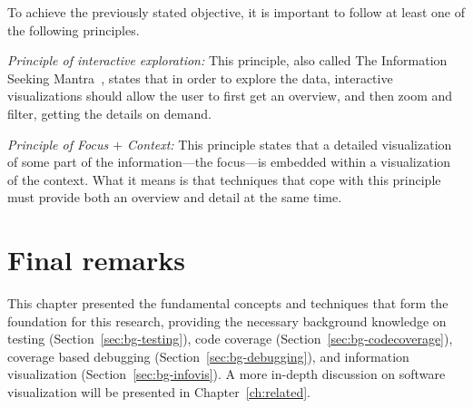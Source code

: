 To achieve the previously stated objective, it is important to follow at least
one of the following principles.

\textit{Principle of interactive exploration:} This principle, also called The
Information Seeking Mantra~\cite{shneiderman1996eyes}, states that in order to
explore the data, interactive visualizations should allow the user to first get
an overview, and then zoom and filter, getting the details on demand.

\textit{Principle of Focus $+$ Context:} This principle states that a detailed
visualization of some part of the information---the focus---is embedded within a
visualization of the context. What it means is that techniques that cope with
this principle must provide both an overview and detail at the same time.

\section{Final remarks}

This chapter presented the fundamental concepts and techniques that form the
foundation for this research, providing the necessary background knowledge on
testing (Section~\ref{sec:bg-testing}), code coverage
(Section~\ref{sec:bg-codecoverage}), coverage based debugging
(Section~\ref{sec:bg-debugging}), and information visualization
(Section~\ref{sec:bg-infovis}). A more in-depth discussion on software
visualization will be presented in Chapter~\ref{ch:related}.
